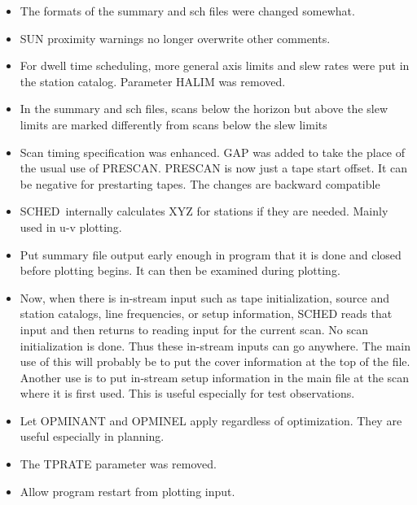 \documentclass{report}
\newcommand{\schedb}{{\sc SCHED~}}
\begin{document}
\begin{itemize}
\item The formats of the summary and sch files were changed somewhat.

\item SUN proximity warnings no longer overwrite other comments.

\item For dwell time scheduling, more general axis limits and slew
      rates were put in the station catalog.  Parameter HALIM was
      removed.

\item In the summary and sch files, scans below the horizon but
      above the slew limits are marked differently from scans below
      the slew limits

\item Scan timing specification was enhanced.  GAP was added to
      take the place of the usual use of PRESCAN.  PRESCAN is now
      just a tape start offset.  It can be negative for prestarting
      tapes.  The changes are backward compatible

\item \schedb internally calculates XYZ for stations if they are
      needed.  Mainly used in u-v plotting.

\item Put summary file output early enough in program that it is
      done and closed before plotting begins.  It can then be
      examined during plotting.

\item Now, when there is in-stream input such as tape initialization,
      source and station catalogs, line frequencies, or setup information,
      SCHED reads that input and then returns to reading input for
      the current scan.  No scan initialization is done.  Thus these
      in-stream inputs can go anywhere.  The main use of this will
      probably be to put the cover information at the top of the file.
      Another use is to put in-stream setup information in the main
      file at the scan where it is first used.  This is useful
      especially for test observations.

\item Let OPMINANT and OPMINEL apply regardless of optimization.  They
      are useful especially in planning.

\item The TPRATE parameter was removed.

\item Allow program restart from plotting input.


\end{itemize}
\end{document}
